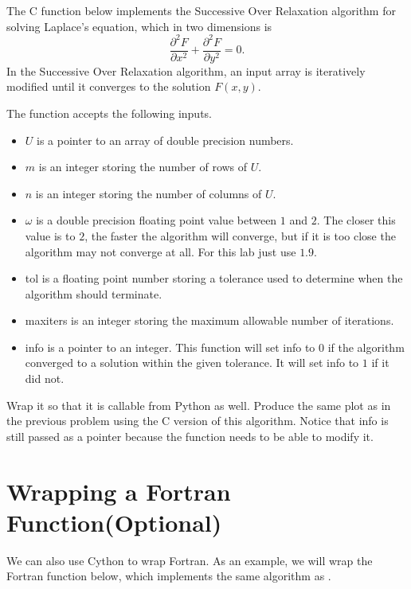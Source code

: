 The C function  below implements the Successive Over Relaxation algorithm for solving Laplace's equation, which in two dimensions is
\[
\frac{\partial^2 F}{\partial x^2} + \frac{\partial^2 F}{\partial y^2} = 0.
\]
In the Successive Over Relaxation algorithm, an input array is iteratively modified until it converges to the solution $F(x,y)$.



The function  accepts the following inputs.
\begin{itemize}
\item $U$ is a pointer to an array of double precision numbers.
\item $m$ is an integer storing the number of rows of $U$.
\item $n$ is an integer storing the number of columns of $U$.
\item $\omega$ is a double precision floating point value between $1$ and $2$.
The closer this value is to $2$, the faster the algorithm will converge, but if it is too close the algorithm may not converge at all.
For this lab just use $1.9$.
\item tol is a floating point number storing a tolerance used to determine when the algorithm should terminate.
\item maxiters is an integer storing the maximum allowable number of iterations.
\item info is a pointer to an integer.
This function will set info to $0$ if the algorithm converged to a solution within the given tolerance.
It will set info to $1$ if it did not.
\end{itemize}



\begin{problem}
Wrap it so that it is callable from Python as well.
Produce the same plot as in the previous problem using the C version of this algorithm.
Notice that info is still passed as a pointer because the function needs to be able to modify it.
\end{problem}

\section*{Wrapping a Fortran Function(Optional)}
We can also use Cython to wrap Fortran.
As an example, we will wrap the Fortran function below, which implements the same algorithm as .

